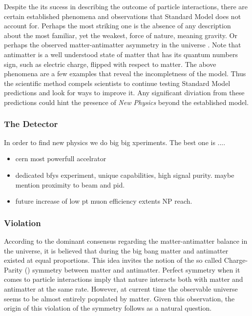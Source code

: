 Despite the its sucess in describing the outcome of particle interactions, there are certain
established phenomena and observations that Standard Model does not account for.
Perhaps the most striking one is the absence of any description about the most familiar,
yet the weakest, force of nature, meaning gravity. Or perhaps the observed matter-antimatter
asymmetry in the universe \cite{more-cpv-huet,more-cpv-gavela_I,more-cpv-gavela_II}.
Note that antimatter is a well understood state of matter that has its quantum numbers sign,
such as electric charge, flipped with respect to matter. The above phenomena are a few
examples that reveal the incompletness of the model. Thus the scientific method compels
scientists to continue testing Standard Model predictions and look for ways to improve it.
Any significant diviation from these predictions could hint the presence of
{\it New Physics} beyond the established model.


\subsubsection{The \lhcb Detector}
In order to find new physics we do big big xperiments. The best one is ....
\begin{itemize}
\item \lhc cern most powerfull accelrator
\item \lhcb dedicated bfys experiment, unique capabilities, high signal purity. maybe mention proximity to beam and pid.
\item future increase of low pt muon efficiency extents NP reach.
\end{itemize}


\subsubsection{\CP Violation}
According to the dominant consensus regarding the matter-antimatter balance in the
universe, it is believed that during the big bang matter and antimatter existed at
equal proportions. This idea invites the notion of the so called Charge-Parity (\CP)
symmetry between matter and antimatter. Perfect \CP symmetry when it comes to particle
interactions imply that nature interacts both with matter and antimatter at the same rate.
However, at current time the observable universe seems to be almost entirely populated by
matter. Given this observation, the origin of this violation of the \CP symmetry follows
as a natural question.

